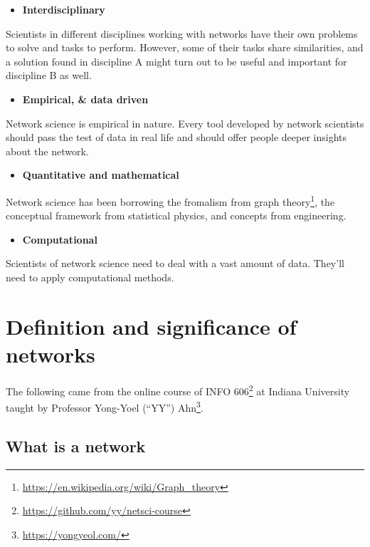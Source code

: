 \documentclass[
]{krantz}
\makeatletter
\providecommand{\tightlist}{%
  \setlength{\itemsep}{0pt}\setlength{\parskip}{0pt}}
\renewcommand{\href}[2]{#2\footnote{\url{#1}}}
\newenvironment{kframe}{%
\medskip{}
\setlength{\fboxsep}{.8em}
 \def\at@end@of@kframe{}%
 \ifinner\ifhmode%
  \def\at@end@of@kframe{\end{minipage}}%
  \begin{minipage}{\columnwidth}%
 \fi\fi%
 \def\FrameCommand##1{\hskip\@totalleftmargin \hskip-\fboxsep
 \colorbox{shadecolor}{##1}\hskip-\fboxsep
     \hskip-\linewidth \hskip-\@totalleftmargin \hskip\columnwidth}%
 \MakeFramed {\advance\hsize-\width
   \@totalleftmargin\z@ \linewidth\hsize
   \@setminipage}}%
 {\par\unskip\endMakeFramed%
 \at@end@of@kframe}
\newenvironment{rmdblock}[1]
  {
  \begin{itemize}
  \renewcommand{\labelitemi}{
    \raisebox{-.7\height}[0pt][0pt]{
      {\setkeys{Gin}{width=3em,keepaspectratio}\texttt{[image: images/\#1]}}
    }
  }
  \setlength{\fboxsep}{1em}
  \begin{kframe}
  \item
  }
  {
  \end{kframe}
  \end{itemize}
  }
\newenvironment{rmdnote}
  {\begin{rmdblock}{note}}
  {\end{rmdblock}}
\makeatother
\begin{document}
\begin{itemize}
\tightlist
\item
  \textbf{Interdisciplinary}
\end{itemize}

Scientists in different disciplines working with networks have their own problems to solve and tasks to perform. However, some of their tasks share similarities, and a solution found in discipline A might turn out to be useful and important for discipline B as well.

\begin{itemize}
\tightlist
\item
  \textbf{Empirical, \& data driven}
\end{itemize}

Network science is empirical in nature. Every tool developed by network scientists should pass the test of data in real life and should offer people deeper insights about the network.

\begin{itemize}
\tightlist
\item
  \textbf{Quantitative and mathematical}
\end{itemize}

Network science has been borrowing the fromalism from \href{https://en.wikipedia.org/wiki/Graph_theory}{graph theory}, the conceptual framework from statistical physics, and concepts from engineering.

\begin{itemize}
\tightlist
\item
  \textbf{Computational}
\end{itemize}

Scientists of network science need to deal with a vast amount of data. They'll need to apply computational methods.

\hypertarget{definition-and-significance-of-networks}{%
\section{Definition and significance of networks}\label{definition-and-significance-of-networks}}

\begin{rmdnote}
The following came from the online course of \href{https://github.com/yy/netsci-course}{INFO 606} at Indiana University taught by Professor \href{https://yongyeol.com/}{Yong-Yoel (``YY'') Ahn}.
\end{rmdnote}

\hypertarget{what-is-a-network}{%
\subsection{What is a network}\label{what-is-a-network}}
\end{document}
